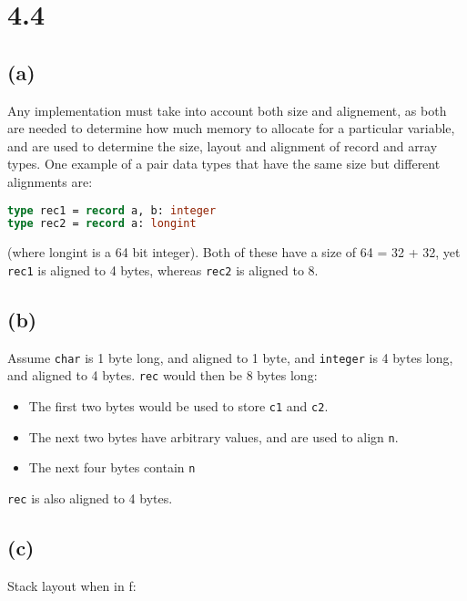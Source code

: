 \section{4.4}
\subsection{(a)}
Any implementation must take into account both size and alignement, as both are needed to determine how much memory to allocate for a particular variable, and are used to determine the size, layout and alignment of record and array types.
One example of a pair data types that have the same size but different alignments are:

\begin{lstlisting}[language=Pascal]
type rec1 = record a, b: integer
type rec2 = record a: longint
\end{lstlisting}

(where longint is a 64 bit integer). Both of these have a size of 64 = 32 + 32, yet \texttt{rec1} is aligned to 4 bytes, whereas \texttt{rec2} is aligned to 8.

\subsection{(b)}

Assume \texttt{char} is 1 byte long, and aligned to 1 byte, and \texttt{integer} is 4 bytes long, and aligned to 4 bytes. \texttt{rec} would then be 8 bytes long:

\begin{itemize}
\item The first two bytes would be used to store \texttt{c1} and \texttt{c2}.
\item The next two bytes have arbitrary values, and are used to align \texttt{n}.
\item The next four bytes contain \texttt{n}
\end{itemize}

\texttt{rec} is also aligned to 4 bytes.

\subsection{(c)}

Stack layout when in f:



